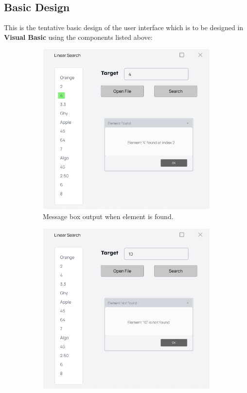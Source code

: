 \documentclass[12pt,a4paper]{article}
\begin{document}
    \subsection{Basic Design}
    This is the tentative basic design of the user interface which is to be designed in \textbf{Visual Basic} using the components listed above:
    \begin{figure}[H]
        \centering
        \begin{subfigure}[b]{0.45\linewidth}
            \includegraphics[width=\linewidth]{Prototype.png} 
            \caption{Message box output when element is found.}
            \label{fig:sub1}
        \end{subfigure}
        \hfill
        \begin{subfigure}[b]{0.45\linewidth}
            \includegraphics[width=\linewidth]{Prototype-2.png}

\end{subfigure}
\end{figure}
\end{document}
